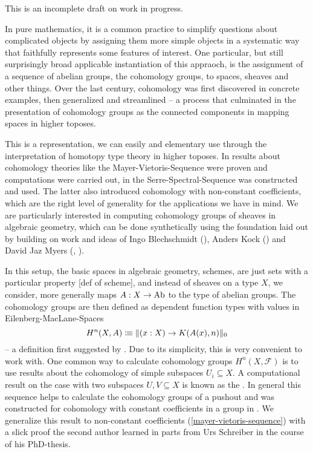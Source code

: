This is an incomplete draft on work in progress.

In pure mathematics,
it is a common practice to simplify questions about complicated objects
by assigning them more simple objects in a systematic way that faithfully represents some features of interest.
One particular, but still surprisingly broad applicable instantiation of this appraoch,
is the assignment of a sequence of abelian groups, the cohomology groups, to spaces, sheaves and other things.
Over the last century, cohomology was first discovered in concrete examples, then generalized and streamlined --
a process that culminated in the presentation of cohomology groups as the connected components in mapping spaces in higher toposes.

This is a representation, we can easily and elementary use through the interpretation of homotopy type theory in higher toposes.
In \cite{evan-master-thesis} results about cohomology theories like the Mayer-Vietoris-Sequence were proven and computations were carried out,
in \cite{floris-thesis} the Serre-Spectral-Sequence was constructed and used.
The latter also introduced cohomology with non-constant coefficients,
which are the right level of generality for the applications we have in mind.
We are particularly interested in computing cohomology groups of sheaves in algebraic geometry,
which can be done synthetically using the foundation laid out by \cite{draft}
building on work and ideas of Ingo Blechschmidt (\cite{ingo-thesis}), Anders Kock (\cite{kock-sdg})
and David Jaz Myers (\cite{myers-talk1}, \cite{myers-talk2}).

In this setup, the basic spaces in algebraic geometry, schemes, are just sets with a particular property \cite{draft}[def of scheme],
and instead of sheaves on a type $X$, we consider, more generally maps $A:X\to\operatorname{Ab}$ to the type of abelian groups.
The cohomology groups are then defined as dependent function types with values in Eilenberg-MacLane-Spaces
\[ H^n(X,A)\vcentcolon\mspace{-1.2mu}\equiv \|(x:X)\to K(A(x),n)\|_0\]
-- a definition first suggested by \cite{mike-blogpost}.
Due to its simplicity, this is very convenient to work with.
One common way to calculate cohomology groups $H^n(X,\mathcal F)$ is to
use results about the cohomology of simple subspaces $U_i\subseteq X$.
A computational result on the case with two subspaces $U,V\subseteq X$ is known as the .
In general this sequence helps to calculate the cohomology groups of a pushout
and was constructed for cohomology with constant coefficients in a group in \cite{evan-master-thesis}.
We generalize this result to non-constant coefficients (\cref{mayer-vietoris-sequence})
with a slick proof the second author learned in parts from Urs Schreiber in the course of his PhD-thesis.

